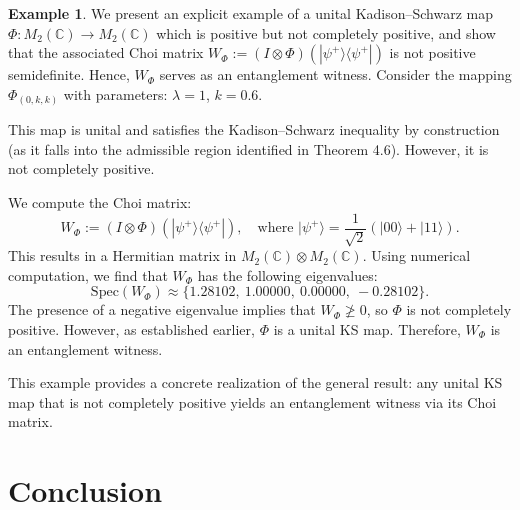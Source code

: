 \documentclass[11pt,reqno]{amsart}
\theoremstyle{definition}
\newtheorem{example}{Example}
\numberwithin{equation}{section} \setcounter{tocdepth}{1}
\numberwithin{equation}{section}
\begin{document}
\begin{example}

We present an explicit example of a unital Kadison–Schwarz map \( \Phi: M_2(\mathbb{C}) \to M_2(\mathbb{C}) \) which is positive but not completely positive, and show that the associated Choi matrix \( W_\Phi := (I \otimes \Phi)(|\psi^+\rangle\langle\psi^+|) \) is not positive semidefinite. Hence, \( W_\Phi \) serves as an entanglement witness.
Consider the  mapping \( \Phi_{(0,k,k)}\)
with parameters: $\lambda = 1$, $k=0.6$.

This map is unital and satisfies the Kadison–Schwarz inequality by construction (as it falls into the admissible region identified in Theorem 4.6). However, it is not completely positive.

We compute the Choi matrix:
\[
W_\Phi := (I \otimes \Phi)(|\psi^+\rangle\langle\psi^+|), \quad \text{where } |\psi^+\rangle = \frac{1}{\sqrt{2}}(|00\rangle + |11\rangle).
\]
This results in a Hermitian matrix in \( M_2(\mathbb{C}) \otimes M_2(\mathbb{C}) \). Using numerical computation, we find that \( W_\Phi \) has the following eigenvalues:
\[
\mathrm{Spec}(W_\Phi) \approx \{1.28102,\ 1.00000,\ 0.00000,\ -0.28102\}.
\]
The presence of a negative eigenvalue implies that \( W_\Phi \ngeq 0 \), so \( \Phi \) is not completely positive. However, as established earlier, \( \Phi \) is a unital KS map. Therefore, \( W_\Phi \) is an entanglement witness.

This example provides a concrete realization of the general result: any unital KS map that is not completely positive yields an entanglement witness via its Choi matrix.
\end{example}


\section{Conclusion}
\end{document}
